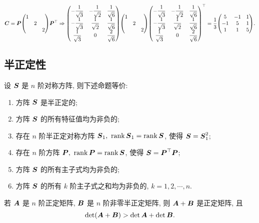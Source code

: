 \begin{solution}
\begin{enumerate}[label=(\arabic{*})]
              $\vb*{C}=\vb*{P}\mqty(1\\&2\\&&2)\vb*{P}^\top\Rightarrow\mqty(-\dfrac{1}{\sqrt{3}}&-\dfrac{1}{\sqrt{2}}&\dfrac{1}{\sqrt{6}}\\[6pt]-\dfrac{1}{\sqrt{3}}&\dfrac{1}{\sqrt{2}}&\dfrac{1}{\sqrt{6}}\\[6pt]\dfrac{1}{\sqrt{3}}&0&\dfrac{2}{\sqrt{6}})\mqty(1\\&2\\&&2)\mqty(-\dfrac{1}{\sqrt{3}}&-\dfrac{1}{\sqrt{2}}&\dfrac{1}{\sqrt{6}}\\[6pt]-\dfrac{1}{\sqrt{3}}&\dfrac{1}{\sqrt{2}}&\dfrac{1}{\sqrt{6}}\\[6pt]\dfrac{1}{\sqrt{3}}&0&\dfrac{2}{\sqrt{6}})^\top=\dfrac{1}{3}\mqty(5&-1&1\\-1&5&1\\1&1&5).$
    \end{enumerate}
\end{solution}

\subsection{半正定性}

\begin{theorem}[对称方阵的等价命题]
    设 $\vb*{S}$ 是 $n$ 阶对称方阵, 则下述命题等价:
    \begin{enumerate}[label=(\arabic{*})]
        \item 方阵 $\vb*{S}$ 是半正定的;
        \item 方阵 $\vb*{S}$ 的所有特征值均为非负的;
        \item 存在 $n$ 阶半正定对称方阵 $\vb*{S}_1,~\rank\vb*{S}_1=\rank\vb*{S}$, 使得 $\vb*{S}=\vb*{S}_1^2$;
        \item 存在 $n$ 阶方阵 $\vb*{P},~\rank\vb*{P}=\rank\vb*{S}$, 使得 $\vb*{S}=\vb*{P}^\top\vb*{P}$;
        \item 方阵 $\vb*{S}$ 的所有主子式均为非负的;
        \item 方阵 $\vb*{S}$ 的所有 $k$ 阶主子式之和均为非负的, $k=1,2,\cdots,n.$
    \end{enumerate}
\end{theorem}

\begin{theorem}
    若 $\vb*{A}$  是 $n$ 阶正定矩阵, $\vb*{B}$ 是 $n$ 阶非零半正定矩阵, 则 $\vb*{A}+\vb*{B}$ 是正定矩阵, 且 $$\det(\vb*{A}+\vb*{B})>\det\vb*{A}+\det\vb*{B}.$$
\end{theorem}

